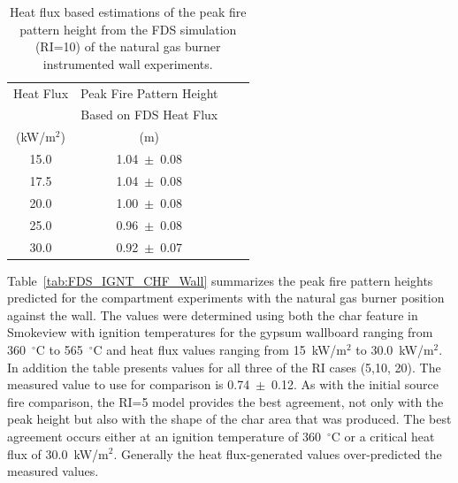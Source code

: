 \documentclass[twoside]{uocthesis}
\begin{document}
{\begin{table}[h]
  \small
  \centering
  \begin{tabular}{|c|c|c|c|} \hline 
Heat Flux 		&  Peak Fire Pattern Height  	      		  \\
    			&  Based on FDS Heat Flux    	  	  	  \\
    (kW/m$^2$)			&  (m) 					 				   \\ 
\hline    15.0			&  1.04~$\pm$~0.08       		            \\
\hline    17.5			&  1.04~$\pm$~0.08							    \\
\hline    20.0			&  1.00~$\pm$~0.08								\\
\hline	  25.0			&  0.96~$\pm$~0.08							   	  \\
\hline    30.0   		&  0.92~$\pm$~0.07							\\  \hline
  \end{tabular}
  \caption[Heat flux based estimations of the peak fire pattern height from the FDS simulation (RI=10) of the natural gas burner instrumented wall experiments.]{Heat flux based estimations of the peak fire pattern height from the FDS simulation (RI=10) of the natural gas burner instrumented wall experiments.}
  \label{tab:FDS_CriticalHF_IWNG}
\end{table}

Table~\ref{tab:FDS_IGNT_CHF_Wall} summarizes the peak fire pattern heights predicted for the compartment experiments with the natural gas burner position against the wall.  The values were determined using both the char feature in Smokeview with ignition temperatures for the gypsum wallboard ranging from 360~$^\circ$C to 565~$^\circ$C and heat flux values ranging from 15~kW/m$^2$ to 30.0~kW/m$^2$.  In addition the table presents values for all three of the RI cases (5,10, 20). The measured value to use for comparison is 0.74~$\pm$~0.12.  As with the initial source fire comparison, the RI=5 model provides the best agreement, not only with the peak height but also with the shape of the char area that was produced. The best agreement occurs either at an ignition temperature of 360~$^\circ$C or a critical heat flux of 30.0~kW/m$^2$. Generally the heat flux-generated values over-predicted the measured values. 

}
\end{document}
